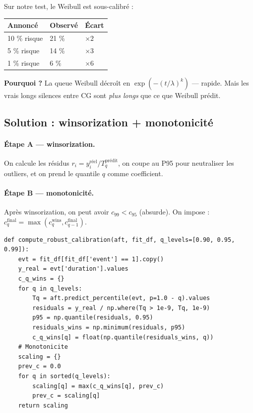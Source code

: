 \documentclass[11pt,a4paper]{article}
\begin{document}
Sur notre test, le Weibull est sous-calibré :

\begin{table}[H]
\centering
\begin{tabular}{lll}
\toprule
\textbf{Annoncé} & \textbf{Observé} & \textbf{Écart} \\
\midrule
10 \% risque & 21 \% & $\times 2$ \\
 5 \% risque & 14 \% & $\times 3$ \\
 1 \% risque &  6 \% & $\times 6$ \\
\bottomrule
\end{tabular}
\end{table}

\textbf{Pourquoi ?} La queue Weibull décroît en $\exp(-(t/\lambda)^k)$ — rapide. Mais les
vrais longs silences entre CG sont \emph{plus longs} que ce que Weibull prédit.

\subsection{Solution : winsorization + monotonicité}

\paragraph{Étape A — winsorization.} On calcule les résidus $r_i = y_i^{\text{réel}} / T_q^{\text{prédit}}$,
on coupe au P95 pour neutraliser les outliers, et on prend le quantile $q$ comme coefficient.

\paragraph{Étape B — monotonicité.} Après winsorization, on peut avoir $c_{99} < c_{95}$
(absurde). On impose : $c_q^{\text{final}} = \max(c_q^{\text{wins}}, c_{q-1}^{\text{final}})$.

\begin{lstlisting}[caption={Calibration robuste.}]
def compute_robust_calibration(aft, fit_df, q_levels=[0.90, 0.95, 0.99]):
    evt = fit_df[fit_df['event'] == 1].copy()
    y_real = evt['duration'].values
    c_q_wins = {}
    for q in q_levels:
        Tq = aft.predict_percentile(evt, p=1.0 - q).values
        residuals = y_real / np.where(Tq > 1e-9, Tq, 1e-9)
        p95 = np.quantile(residuals, 0.95)
        residuals_wins = np.minimum(residuals, p95)
        c_q_wins[q] = float(np.quantile(residuals_wins, q))
    # Monotonicite
    scaling = {}
    prev_c = 0.0
    for q in sorted(q_levels):
        scaling[q] = max(c_q_wins[q], prev_c)
        prev_c = scaling[q]
    return scaling
\end{lstlisting}
\end{document}
